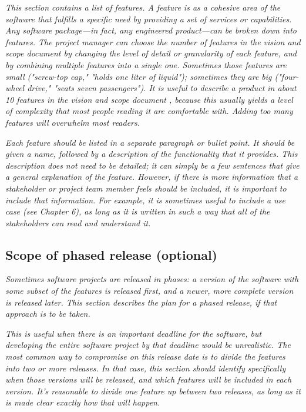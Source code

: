 \documentclass{article}
\begin{document}
    \textit{This section contains a list of features. A feature is as a
    cohesive area of the software that fulfills a specific need by
    providing a set of services or capabilities. Any software
    package---in fact, any engineered product---can be broken down
    into features. The project manager can choose the number of
    features in the vision and scope document by changing the level of
    detail or granularity of each feature, and by combining multiple
    features into a single one. Sometimes those features are small
    ("screw-top cap," "holds one liter of liquid"); sometimes they are
    big ("four-wheel drive," "seats seven passengers"). It is useful
    to describe a product in about 10 features in the vision and scope
    document , because this usually yields a level of complexity that
    most people reading it are comfortable with. Adding too many
    features will overwhelm most readers.}

    \textit{Each feature should be listed in a separate paragraph or bullet
    point. It should be given a name, followed by a description of the
    functionality that it provides. This description does not need to
    be detailed; it can simply be a few sentences that give a general
    explanation of the feature. However, if there is more information
    that a stakeholder or project team member feels should be
    included, it is important to include that information. For
    example, it is sometimes useful to include a use case (see Chapter
    6), as long as it is written in such a way that all of the
    stakeholders can read and understand it.}

\subsection{Scope of phased release (optional)}

    \textit{Sometimes software projects are released in phases: a version of
    the software with some subset of the features is released first,
    and a newer, more complete version is released later. This section
    describes the plan for a phased release, if that approach is to be
    taken.}

    \textit{This is useful when there is an important deadline for the
    software, but developing the entire software project by that
    deadline would be unrealistic. The most common way to compromise
    on this release date is to divide the features into two or more
    releases. In that case, this section should identify specifically
    when those versions will be released, and which features will be
    included in each version. It's reasonable to divide one feature up
    between two releases, as long as it is made clear exactly how that
    will happen.}
\end{document}
